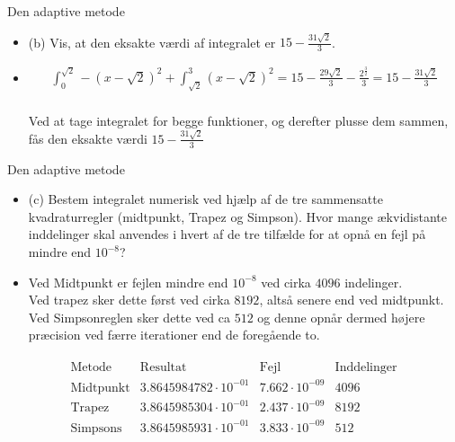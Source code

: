 \begin{frame}{Den adaptive metode}
    \begin{itemize}
        \item (b) Vis, at den eksakte værdi af integralet er $15-\frac{31\sqrt{2}}{3}$.
        \item \begin{align*}
            \int^{\sqrt{2}}_0-(x-\sqrt{2})^2+\int^3_{\sqrt{2}}(x-\sqrt{2})^2=15-\frac{29\sqrt{2}}{3}-\frac{2^{\frac{3}{2}}}{3}=15-\frac{31\sqrt{2}}{3} 
            \end{align*} \\
            Ved at tage integralet for begge funktioner, og derefter plusse dem sammen, fås den eksakte værdi $15-\frac{31\sqrt{2}}{3}$ \\
    \end{itemize}
\end{frame}


\begin{frame}{Den adaptive metode}
    \begin{itemize}
        \item (c) Bestem integralet numerisk ved hjælp af de tre sammensatte kvadraturregler (midtpunkt, Trapez og Simpson). 
        Hvor mange ækvidistante inddelinger skal anvendes i hvert af de tre tilfælde for at opnå en fejl på mindre end $10^{-8}$?
        \item Ved Midtpunkt er fejlen mindre end $10^{-8}$ ved cirka $4096$ indelinger.\\
        Ved trapez sker dette først ved cirka $8192$, altså senere end ved midtpunkt.\\ 
        Ved Simpsonreglen sker dette ved ca $512$ og denne opnår dermed højere præcision ved færre iterationer end de foregående to.
    \end{itemize} 
\end{frame}

\begin{frame}
\begin{align*}
\begin{array}{l|c|c|c}
\text{Metode} & \text{Resultat}& \text{Fejl} &  \text{Inddelinger} \\
\hline
\text{Midtpunkt}	& 3.8645984782 \cdot 10^{-01} & 7.662 \cdot 10^{-09}	& 4096 \\
\text{Trapez}		& 3.8645985304 \cdot 10^{-01} & 2.437 \cdot 10^{-09} & 8192 \\
\text{Simpsons}		& 3.8645985931 \cdot 10^{-01} & 3.833 \cdot 10^{-09} & 512 \\
\end{array}
\end{align*}
\end{frame}

